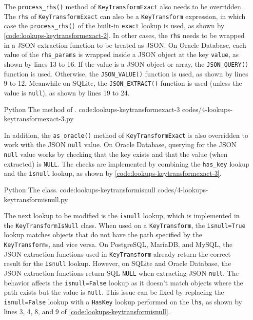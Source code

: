 The \verb|process_rhs()| method of \verb|KeyTransformExact| also needs to be
overridden. The \verb|rhs| of \verb|KeyTransformExact| can also be a
\verb|KeyTransform| expression, in which case the \verb|process_rhs()| of the
built-in \verb|exact| lookup is used, as shown by
\autoref{code:lookups-keytransformexact-2}. In other cases, the \verb|rhs|
needs to be wrapped in a JSON extraction function to be treated as JSON. On
Oracle Database, each value of the \verb|rhs_params| is wrapped inside a JSON
object at the key \verb|value|, as shown by lines 13 to 16. If the value is a
JSON object or array, the \verb|JSON_QUERY()| function is used. Otherwise, the
\verb|JSON_VALUE()| function is used, as shown by lines 9 to 12. Meanwhile on
SQLite, the \verb|JSON_EXTRACT()| function is used (unless the value is
\verb|null|), as shown by lines 19 to 24.

\listing
{Python}
{The  method of .}
{code:lookups-keytransformexact-3}
{codes/4-lookups-keytransformexact-3.py}

In addition, the \verb|as_oracle()| method of \verb|KeyTransformExact| is also
overridden to work with the JSON \verb|null| value. On Oracle Database,
querying for the JSON \verb|null| value works by checking that the key exists
and that the value (when extracted) is \verb|NULL|. The checks are implemented
by combining the \verb|has_key| lookup and the \verb|isnull| lookup, as shown
by \autoref{code:lookups-keytransformexact-3}.

\listing
{Python}
{The  class.}
{code:lookups-keytransformisnull}
{codes/4-lookups-keytransformisnull.py}

The next lookup to be modified is the \verb|isnull| lookup, which is
implemented in the \verb|KeyTransformIsNull| class. When used on a
\verb|KeyTransform|, the \verb|isnull=True| lookup matches objects that do not
have the path specified by the \verb|KeyTransform|s, and vice versa. On
PostgreSQL, MariaDB, and MySQL, the JSON extraction functions used in
\verb|KeyTransform| already return the correct result for the \verb|isnull|
lookup. However, on SQLite and Oracle Database, the JSON extraction functions
return SQL \verb|NULL| when extracting JSON \verb|null|. The behavior affects
the \verb|isnull=False| lookup as it doesn't match objects where the path
exists but the value is \verb|null|. This issue can be fixed by replacing the
\verb|isnull=False| lookup with a \verb|HasKey| lookup performed on the
\verb|lhs|, as shown by lines 3, 4, 8, and 9 of
\autoref{code:lookups-keytransformisnull}.

